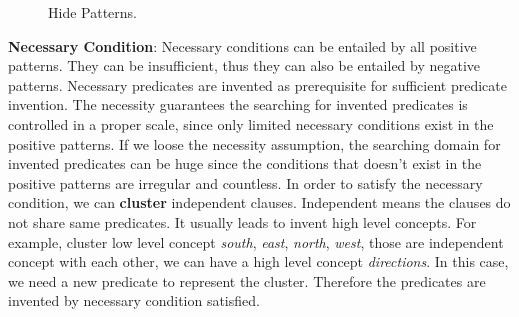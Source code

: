 \documentclass[
]{ceurart}
\begin{document}
\begin{figure}[!htb]
	\caption{Hide Patterns.}
	\label{fig:hide-patterns}
\end{figure}



\textbf{Necessary Condition}: %
Necessary conditions can be entailed by all positive patterns. They can be insufficient, thus they can also be entailed by negative patterns. Necessary predicates are invented as prerequisite for sufficient predicate invention.
The necessity guarantees the searching for invented predicates is controlled in a proper scale, since only limited necessary conditions exist in the positive patterns. 
If we loose the necessity assumption, the searching domain for invented predicates can be huge since the conditions that doesn't exist in the positive patterns are irregular and  countless. 
In order to satisfy the necessary condition, we can \textbf{cluster} independent clauses. Independent means the clauses do not share same predicates. It usually leads to invent high level concepts. For example, cluster low level concept \textit{south}, \textit{east}, \textit{north}, \textit{west}, those are independent concept with each other, we can have a high level concept \textit{directions}. In this case, we need a new predicate to represent the cluster. Therefore the predicates are invented by necessary condition satisfied.
\end{document}
